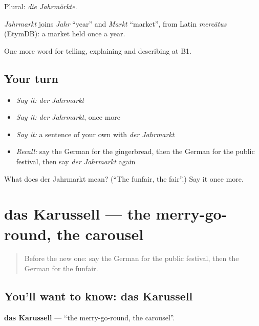 Plural: \emph{die Jahrmärkte}.

\begin{cousinweb}
\emph{Jahrmarkt} joins \emph{Jahr} \textquotedblleft{}year\textquotedblright{} and \emph{Markt} \textquotedblleft{}market\textquotedblright{}, from Latin \emph{mercātus} (EtymDB): a market held once a year.
\end{cousinweb}

\begin{grammarlens}[title={What you've built}]
One more word for telling, explaining and describing at B1.
\end{grammarlens}

\subsection*{Your turn}
\begin{itemize}
\raggedright
  \item \emph{Say it:} \emph{der Jahrmarkt}
  \item \emph{Say it:} \emph{der Jahrmarkt}, once more
  \item \emph{Say it:} a sentence of your own with \emph{der Jahrmarkt}
  \item \emph{Recall:} say the German for the gingerbread, then the German for the public festival, then say \emph{der Jahrmarkt} again
\end{itemize}

\begin{tcolorbox}[breakable,colback=teal!4,colframe=teal!35!black,title={Before you move on}]
What does der Jahrmarkt mean? (\textquotedblleft{}The funfair, the fair\textquotedblright{}.) Say it once more.
\end{tcolorbox}
\section[das Karussell]{das Karussell — the merry-go-round, the carousel}

\label{lesson:GE-C312-karussell}



\begin{quote}
Before the new one: say the German for the public festival, then the German for the funfair.
\end{quote}

\subsection*{You'll want to know: das Karussell}
\textbf{das Karussell} — \textquotedblleft{}the merry-go-round, the carousel\textquotedblright{}.

